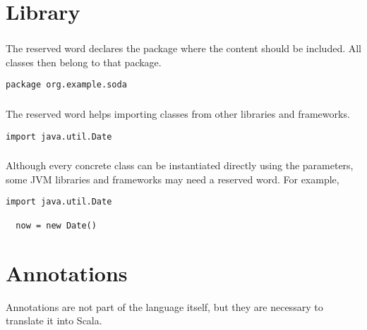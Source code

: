 \documentclass[12pt,a4paper]{book}
\begin{document}
    \section{Library}

    \subsubsection{\spackage}

    The reserved word \spackage declares the package where the content should be included.
    All classes then belong to that package.

    \begin{lstlisting}[label={lst:examplePackage}]
  package org.example.soda
    \end{lstlisting}

    \subsubsection{\simport}

    The reserved word \simport helps importing classes from other libraries and frameworks.

    \begin{lstlisting}[label={lst:exampleImport}]
  import java.util.Date
    \end{lstlisting}

    \subsubsection{\snew}

    Although every concrete class can be instantiated directly using the parameters, some JVM libraries and frameworks may need a \snew reserved word.
    For example,

    \begin{lstlisting}[label={lst:exampleImportDate}]
  import java.util.Date

  now = new Date()
    \end{lstlisting}


    \section{Annotations}

    Annotations are not part of the language itself, but they are necessary to translate it into Scala.

    \subsubsection{\soverride}
\end{document}
